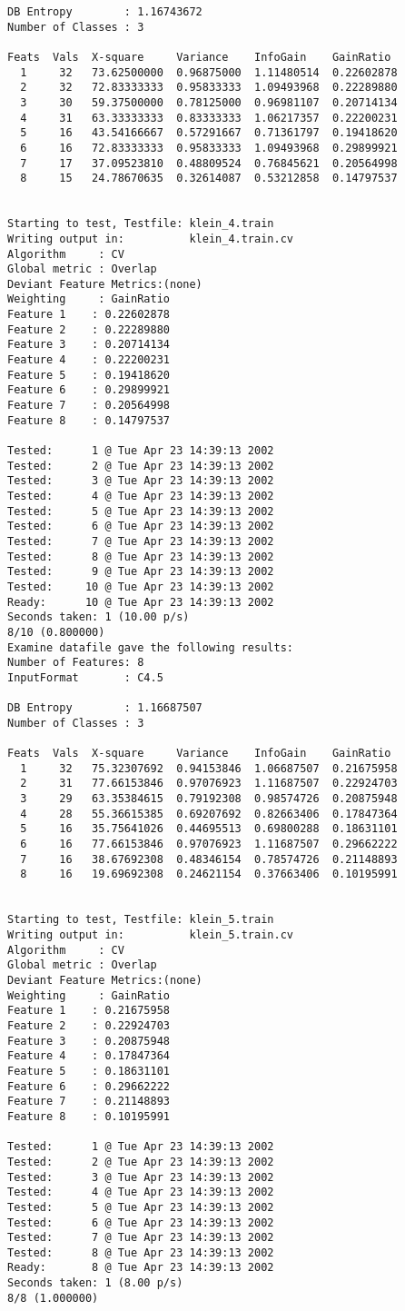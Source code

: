 \documentclass{article}
\begin{document}
\begin{verbatim}
DB Entropy        : 1.16743672
Number of Classes : 3

Feats  Vals  X-square     Variance    InfoGain    GainRatio
  1     32   73.62500000  0.96875000  1.11480514  0.22602878
  2     32   72.83333333  0.95833333  1.09493968  0.22289880
  3     30   59.37500000  0.78125000  0.96981107  0.20714134
  4     31   63.33333333  0.83333333  1.06217357  0.22200231
  5     16   43.54166667  0.57291667  0.71361797  0.19418620
  6     16   72.83333333  0.95833333  1.09493968  0.29899921
  7     17   37.09523810  0.48809524  0.76845621  0.20564998
  8     15   24.78670635  0.32614087  0.53212858  0.14797537


Starting to test, Testfile: klein_4.train
Writing output in:          klein_4.train.cv
Algorithm     : CV
Global metric : Overlap
Deviant Feature Metrics:(none)
Weighting     : GainRatio
Feature 1	 : 0.22602878
Feature 2	 : 0.22289880
Feature 3	 : 0.20714134
Feature 4	 : 0.22200231
Feature 5	 : 0.19418620
Feature 6	 : 0.29899921
Feature 7	 : 0.20564998
Feature 8	 : 0.14797537

Tested:      1 @ Tue Apr 23 14:39:13 2002
Tested:      2 @ Tue Apr 23 14:39:13 2002
Tested:      3 @ Tue Apr 23 14:39:13 2002
Tested:      4 @ Tue Apr 23 14:39:13 2002
Tested:      5 @ Tue Apr 23 14:39:13 2002
Tested:      6 @ Tue Apr 23 14:39:13 2002
Tested:      7 @ Tue Apr 23 14:39:13 2002
Tested:      8 @ Tue Apr 23 14:39:13 2002
Tested:      9 @ Tue Apr 23 14:39:13 2002
Tested:     10 @ Tue Apr 23 14:39:13 2002
Ready:      10 @ Tue Apr 23 14:39:13 2002
Seconds taken: 1 (10.00 p/s)
8/10 (0.800000)
Examine datafile gave the following results:
Number of Features: 8
InputFormat       : C4.5

DB Entropy        : 1.16687507
Number of Classes : 3

Feats  Vals  X-square     Variance    InfoGain    GainRatio
  1     32   75.32307692  0.94153846  1.06687507  0.21675958
  2     31   77.66153846  0.97076923  1.11687507  0.22924703
  3     29   63.35384615  0.79192308  0.98574726  0.20875948
  4     28   55.36615385  0.69207692  0.82663406  0.17847364
  5     16   35.75641026  0.44695513  0.69800288  0.18631101
  6     16   77.66153846  0.97076923  1.11687507  0.29662222
  7     16   38.67692308  0.48346154  0.78574726  0.21148893
  8     16   19.69692308  0.24621154  0.37663406  0.10195991


Starting to test, Testfile: klein_5.train
Writing output in:          klein_5.train.cv
Algorithm     : CV
Global metric : Overlap
Deviant Feature Metrics:(none)
Weighting     : GainRatio
Feature 1	 : 0.21675958
Feature 2	 : 0.22924703
Feature 3	 : 0.20875948
Feature 4	 : 0.17847364
Feature 5	 : 0.18631101
Feature 6	 : 0.29662222
Feature 7	 : 0.21148893
Feature 8	 : 0.10195991

Tested:      1 @ Tue Apr 23 14:39:13 2002
Tested:      2 @ Tue Apr 23 14:39:13 2002
Tested:      3 @ Tue Apr 23 14:39:13 2002
Tested:      4 @ Tue Apr 23 14:39:13 2002
Tested:      5 @ Tue Apr 23 14:39:13 2002
Tested:      6 @ Tue Apr 23 14:39:13 2002
Tested:      7 @ Tue Apr 23 14:39:13 2002
Tested:      8 @ Tue Apr 23 14:39:13 2002
Ready:       8 @ Tue Apr 23 14:39:13 2002
Seconds taken: 1 (8.00 p/s)
8/8 (1.000000)
\end{verbatim}
\end{document}
